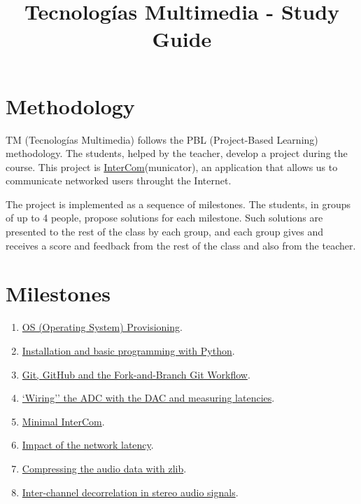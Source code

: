 \title{Tecnologías Multimedia - Study Guide}

\maketitle

\section{Methodology}
TM (Tecnologías Multimedia) follows the PBL (Project-Based Learning) methodology. The students,
helped by the teacher, develop a project during the course. This
project
is \href{https://github.com/Tecnologias-multimedia/intercom}{InterCom}(municator),
an application that allows us to communicate networked users throught
the Internet.

The project is implemented as a sequence of milestones. The students,
in groups of up to 4 people, propose solutions for each
milestone. Such solutions are presented to the rest of the class by
each group, and each group gives and receives a score and feedback
from the rest of the class and also from the teacher.

\section{Milestones}
\begin{enumerate}
\item \href{https://tecnologias-multimedia.github.io/study_guide/provisioning/}{OS (Operating System) Provisioning}.
\item \href{https://tecnologias-multimedia.github.io/study_guide/install/}{Installation and basic programming with Python}.
\item \href{https://tecnologias-multimedia.github.io/study_guide/git/}{Git, GitHub and the Fork-and-Branch Git Workflow}.
\item \href{https://tecnologias-multimedia.github.io/study_guide/wiring/}{`Wiring'' the ADC with the DAC and measuring latencies}.
\item \href{https://tecnologias-multimedia.github.io/study_guide/minimal/}{Minimal InterCom}.
\item \href{https://tecnologias-multimedia.github.io/study_guide/network_latency/}{Impact of the network latency}.
\item \href{https://tecnologias-multimedia.github.io/study_guide/compress/}{Compressing the audio data with zlib}.
\item \href{https://tecnologias-multimedia.github.io/study_guide/stereo_coding/}{Inter-channel decorrelation in stereo audio signals}.
\end{enumerate}

